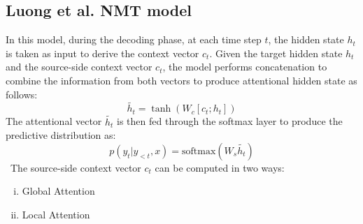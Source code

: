 \subsection{Luong et al. NMT model}
In this model, during the decoding phase, at each time step $t$, the hidden state $h_t$ is taken as input to derive the context vector $c_t$. Given the target hidden state $h_t$ and the source-side context vector $c_t$, the model performs concatenation to combine the information from both vectors to produce attentional hidden state as follows:
\begin{equation}
\label{eq:1.7}
\tilde{h_t} = \tanh (W_c[c_t; h_t])
\end{equation}
The attentional vector $\tilde{h_t}$ is then fed through the softmax layer to produce the predictive distribution as:
\begin{equation}
\label{eq:1.8}
p(y_t|y_{<t}, x) = \text{softmax}(W_s \tilde{h_t})
\end{equation}
\
The source-side context vector $c_t$ can be computed in two ways:
\begin{enumerate}[i.]
\item Global Attention
\item Local Attention
\end{enumerate}

